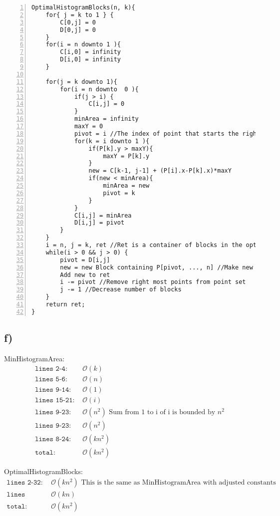 \documentclass[12pt]{article}
\begin{document}
\begin{Verbatim}[numbers=left]
OptimalHistogramBlocks(n, k){
    for{ j = k to 1 } {
        C[0,j] = 0
        D[0,j] = 0
    }
    for(i = n downto 1 ){
        C[i,0] = infinity
        D[i,0] = infinity
    }

    for(j = k downto 1){
        for(i = n downto  0 ){
            if(j > i) {
                C[i,j] = 0
            }
            minArea = infinity
            maxY = 0
            pivot = i //The index of point that starts the right most block in the optimal solution
            for(k = i downto 1 ){
                if(P[k].y > maxY){
                    maxY = P[k].y
                }
                new = C[k-1, j-1] + (P[i].x-P[k].x)*maxY
                if(new < minArea){
                    minArea = new
                    pivot = k
                }
            }
            C[i,j] = minArea
            D[i,j] = pivot
        }
    }
    i = n, j = k, ret //Ret is a container of blocks in the optimal solution
    while(i > 0 && j > 0) {
        pivot = D[i,j]
        new = new Block containing P[pivot, ..., n] //Make new block of right most points past the pivot
        Add new to ret
        i -= pivot //Remove right most points from point set
        j -= 1 //Decrease number of blocks
    }
    return ret;
}
\end{Verbatim}

\subsection*{f)}
MinHistogramArea:\\
\begin{align*}
    \texttt{lines 2-4: } & \mathcal{O}(k)\\
    \texttt{lines 5-6: } & \mathcal{O}(n)\\
    \texttt{lines 9-14: } & \mathcal{O}(1)\\
    \texttt{lines 15-21: } & \mathcal{O}(i)\\
    \texttt{lines 9-23: } & \mathcal{O}(n^2) \text{ Sum from 1 to i of i is bounded by $n^2$}\\
    \texttt{lines 9-23: } & \mathcal{O}(n^2) \\
    \texttt{lines 8-24: } & \mathcal{O}(kn^2)\\
    \texttt{total: } & \mathcal{O}(kn^2)
\end{align*}

OptimalHistogramBlocks:\\
\begin{align*}
    \texttt{lines 2-32: } & \mathcal{O}(kn^2) \text{ This is the same as MinHistogramArea with adjusted constants}\\
    \texttt{lines 33-39: } & \mathcal{O}(kn)\\
    \texttt{total: } & \mathcal{O}(kn^2)
\end{align*}
\end{document}
